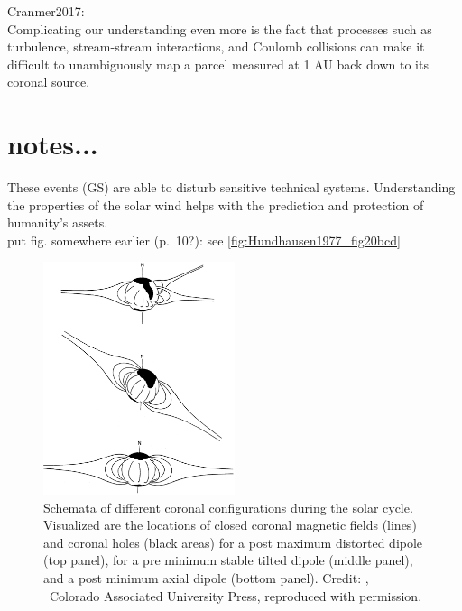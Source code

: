Cranmer2017:\\
Complicating our understanding even more is the fact that processes such as turbulence, stream-stream interactions, and Coulomb collisions can make it difficult to unambiguously map a parcel measured at 1 AU back down to its coronal source.\\



\section{notes...}

These events (GS) are able to disturb sensitive technical systems. Understanding the properties of the solar wind helps with the prediction and protection of humanity's assets.\\

put fig. somewhere earlier (p.~10?): see \autoref{fig:Hundhausen1977_fig20bcd}\\
\begin{figure}[htb]
	\centering
	\includegraphics[width=0.5\textwidth]{figures_of_others/images/Hundhausen1977_fig20bcd.png}
	\caption[Credit: {\citep[Fig.~20, panels (b--d)]{Hundhausen1977}}, \textcopyright~Colorado Associated University Press, reproduced with permission.]
	{Schemata of different coronal configurations during the solar cycle. Visualized are the locations of closed coronal magnetic fields (lines) and coronal holes (black areas) for a post maximum distorted dipole (top panel), for a pre minimum stable tilted dipole (middle panel), and a post minimum axial dipole (bottom panel). Credit: {\citep[Fig.~20, panels (b--d)]{Hundhausen1977}}, \textcopyright~Colorado Associated University Press, reproduced with permission.}
	\label{fig:Hundhausen1977_fig20bcd}
\end{figure}


